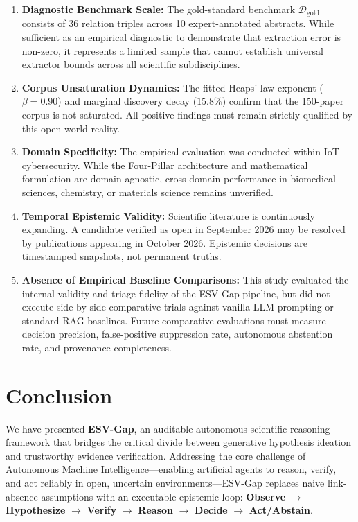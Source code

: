 \documentclass[conference,10pt]{IEEEtran}
\newcommand{\method}{ESV-Gap}
\begin{document}
\begin{enumerate}[label=\arabic*),leftmargin=1.8em]
  \item \textbf{Diagnostic Benchmark Scale:} The gold-standard benchmark $\mathcal{D}_{\text{gold}}$ consists of 36 relation triples across 10 expert-annotated abstracts. While sufficient as an empirical diagnostic to demonstrate that extraction error is non-zero, it represents a limited sample that cannot establish universal extractor bounds across all scientific subdisciplines.
  \item \textbf{Corpus Unsaturation Dynamics:} The fitted Heaps' law exponent ($\beta = 0.90$) and marginal discovery decay ($15.8\%$) confirm that the 150-paper corpus is not saturated. All positive findings must remain strictly qualified by this open-world reality.
  \item \textbf{Domain Specificity:} The empirical evaluation was conducted within IoT cybersecurity. While the Four-Pillar architecture and mathematical formulation are domain-agnostic, cross-domain performance in biomedical sciences, chemistry, or materials science remains unverified.
  \item \textbf{Temporal Epistemic Validity:} Scientific literature is continuously expanding. A candidate verified as open in September 2026 may be resolved by publications appearing in October 2026. Epistemic decisions are timestamped snapshots, not permanent truths.
  \item \textbf{Absence of Empirical Baseline Comparisons:} This study evaluated the internal validity and triage fidelity of the \method{} pipeline, but did not execute side-by-side comparative trials against vanilla LLM prompting or standard RAG baselines. Future comparative evaluations must measure decision precision, false-positive suppression rate, autonomous abstention rate, and provenance completeness.
\end{enumerate}

\section{Conclusion}

We have presented \textbf{\method{}}, an auditable autonomous scientific reasoning framework that bridges the critical divide between generative hypothesis ideation and trustworthy evidence verification. Addressing the core challenge of Autonomous Machine Intelligence---enabling artificial agents to reason, verify, and act reliably in open, uncertain environments---\method{} replaces naive link-absence assumptions with an executable epistemic loop: \textbf{Observe} $\rightarrow$ \textbf{Hypothesize} $\rightarrow$ \textbf{Verify} $\rightarrow$ \textbf{Reason} $\rightarrow$ \textbf{Decide} $\rightarrow$ \textbf{Act/Abstain}.
\end{document}
